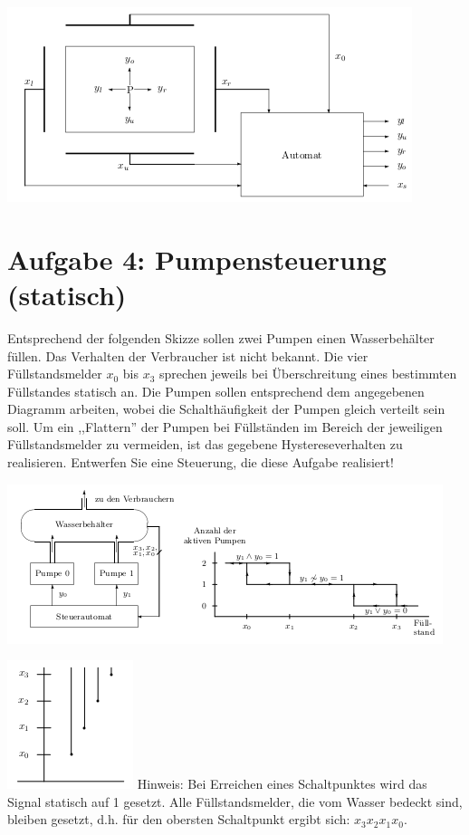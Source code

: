 \documentclass[a4paper,12pt,titlepage]{scrartcl}
\begin{document}
\includegraphics{Assets/Schaltsysteme-praktika-v3.png}

\section*{Aufgabe 4: Pumpensteuerung (statisch)}
Entsprechend der folgenden Skizze sollen zwei Pumpen einen Wasserbehälter füllen. Das Verhalten der Verbraucher ist nicht bekannt.
Die vier Füllstandsmelder $x_0$ bis $x_3$ sprechen jeweils bei Überschreitung eines bestimmten Füllstandes statisch an.
Die Pumpen sollen entsprechend dem angegebenen Diagramm arbeiten, wobei die Schalthäufigkeit der Pumpen gleich verteilt sein soll. Um ein ,,Flattern'' der Pumpen bei Füllständen im Bereich der jeweiligen Füllstandsmelder zu vermeiden, ist das gegebene Hystereseverhalten zu realisieren.
Entwerfen Sie eine Steuerung, die diese Aufgabe realisiert!

\includegraphics{Assets/Schaltsysteme-praktika-v4.png}

\includegraphics{Assets/Schaltsysteme-praktika-v4-2.png}
Hinweis: Bei Erreichen eines Schaltpunktes wird das Signal statisch auf 1 gesetzt. Alle Füllstandsmelder, die vom Wasser bedeckt sind, bleiben gesetzt, d.h. für den obersten Schaltpunkt ergibt sich: $x_3 x_2 x_1 x_0$.
\end{document}
